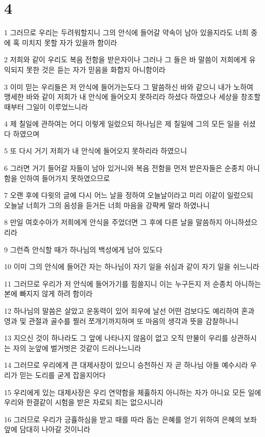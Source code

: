 \chapter{4}

\par 1 그러므로 우리는 두려워할지니 그의 안식에 들어갈 약속이 남아 있을지라도 너희 중에 혹 미치지 못할 자가 있을까 함이라
\par 2 저희와 같이 우리도 복음 전함을 받은자이나 그러나 그 들은 바 말씀이 저희에게 유익되지 못한 것은 듣는 자가 믿음을 화합지 아니함이라
\par 3 이미 믿는 우리들은 저 안식에 들어가는도다 그 말씀하신 바와 같으니 내가 노하여 맹세한 바와 같이 저희가 내 안식에 들어오지 못하리라 하셨다 하였으나 세상을 창조할 때부터 그일이 이루었느니라
\par 4 제 칠일에 관하여는 어디 이렇게 일렀으되 하나님은 제 칠일에 그의 모든 일을 쉬셨다 하였으며
\par 5 또 다시 거기 저희가 내 안식에 들어오지 못하리라 하였으니
\par 6 그러면 거기 들어갈 자들이 남아 있거니와 복음 전함을 먼저 받은자들은 순종치 아니함을 인하여 들어가지 못하였으므로
\par 7 오랜 후에 다윗의 글에 다시 어느 날을 정하여 오늘날이라고 미리 이같이 일렀으되 오늘날 너희가 그의 음성을 듣거든 너희 마음을 강퍅케 말라 하였나니
\par 8 만일 여호수아가 저희에게 안식을 주었더면 그 후에 다른 날을 말씀하지 아니하셨으리라
\par 9 그런즉 안식할 때가 하나님의 백성에게 남아 있도다
\par 10 이미 그의 안식에 들어간 자는 하나님이 자기 일을 쉬심과 같이 자기 일을 쉬느니라
\par 11 그러므로 우리가 저 안식에 들어가기를 힘쓸지니 이는 누구든지 저 순종치 아니하는 본에 빠지지 않게 하려 함이라
\par 12 하나님의 말씀은 살았고 운동력이 있어 죄우에 날선 어떤 검보다도 예리하여 혼과 영과 및 관절과 골수를 찔러 쪼개기까지하며 또 마음의 생각과 뜻을 감찰하나니
\par 13 지으신 것이 하나라도 그 앞에 나타나지 않음이 없고 오직 만물이 우리를 상관하시는 자의 눈앞에 벌거벗은 것같이 드러나느니라
\par 14 그러므로 우리에게 큰 대제사장이 있으니 승천하신 자 곧 하나님 아들 예수시라 우리가 믿는 도리를 굳게 잡을지어다
\par 15 우리에게 있는 대제사장은 우리 연약함을 체휼하지 아니하는 자가 아니요 모든 일에 우리와 한결같이 시험을 받은 자로되 죄는 없으시니라
\par 16 그러므로 우리가 긍휼하심을 받고 때를 따라 돕는 은혜를 얻기 위하여 은혜의 보좌 앞에 담대히 나아갈 것이니라

